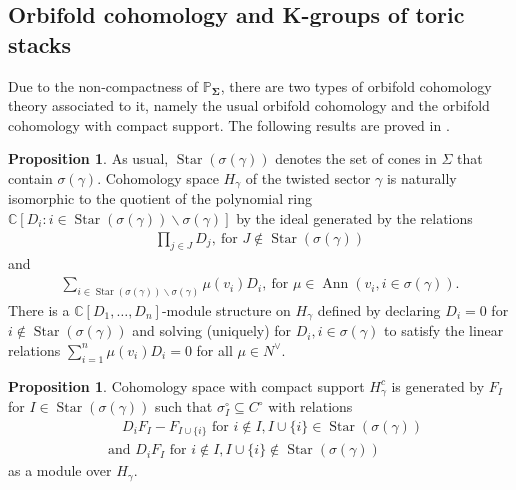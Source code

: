 \documentclass[11pt,reqno]{amsart}
\def\CC {{\mathbb C}}
\def\PP {{\mathbb P}}
\theoremstyle{definition}
\newtheorem{proposition}[theorem]{Proposition}
\numberwithin{equation}{section}
\begin{document}
\subsection{Orbifold cohomology and K-groups of toric stacks}


Due to the non-compactness of $\PP_{\mathbf{\Sigma}}$, there are two types of orbifold cohomology theory associated to it, namely the usual orbifold cohomology and the orbifold cohomology with compact support. The following results are proved in \cite{BHconj}.

\smallskip

\begin{proposition}\label{coh}
As usual, $\operatorname{Star}(\sigma(\gamma))$ denotes the set of cones in $\Sigma$ that contain $\sigma(\gamma)$.
	Cohomology space $H_{\gamma}$ of the twisted sector $\gamma$ is naturally isomorphic to the quotient of the polynomial ring $\CC[D_i:i\in\operatorname{Star}(\sigma(\gamma))\backslash\sigma(\gamma)]$ by the ideal generated by the relations
	\begin{align*}
		\prod_{j\in J}D_j,\ \text{for }J\not\in\operatorname{Star}(\sigma(\gamma))
	\end{align*}
	and
	\begin{align*}
		\sum_{i\in\operatorname{Star}(\sigma(\gamma))\backslash\sigma(\gamma)}\mu(v_i)D_i,\ \text{for } \mu\in\operatorname{Ann}(v_i,i\in\sigma(\gamma)).
	\end{align*}
	There is a $\CC[D_1,\ldots, D_n]$-module structure on $H_{\gamma}$ defined by declaring $D_i=0$ for $i\not\in \operatorname{Star}(\sigma(\gamma))$ and solving (uniquely) for 
$D_i, i\in \sigma(\gamma)$ to satisfy the linear relations $\sum_{i=1}^n \mu(v_i)D_i=0$ for all $\mu\in N^\vee$.
\end{proposition}

\smallskip

\begin{proposition}\label{cohcmp}
	Cohomology space with compact support $H_{\gamma}^c$ is generated by $F_I$ for $I\in\operatorname{Star}(\sigma(\gamma))$ such that $\sigma_I^{\circ}\subseteq C^{\circ}$ with relations
	\begin{align*}
		&\quad D_i F_I-F_{I\cup\{i\}}\text{ for }i\not\in I,I\cup\{i\}\in\operatorname{Star}(\sigma(\gamma))\\
		&\text{and }D_i F_I\text{ for }i\not\in I,I\cup\{i\}\not\in\operatorname{Star}(\sigma(\gamma))
	\end{align*}
as a module over $H_{\gamma}$.
\end{proposition}
\end{document}
